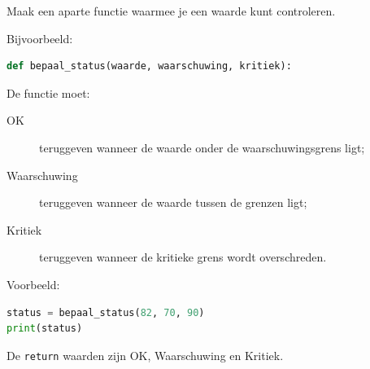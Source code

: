 Maak een aparte functie waarmee je een waarde kunt controleren.

Bijvoorbeeld:
\begin{lstlisting}[language=Python]
def bepaal_status(waarde, waarschuwing, kritiek):
\end{lstlisting}

De functie moet:
\begin{description}
\item[OK] teruggeven wanneer de waarde onder de waarschuwingsgrens ligt;
\item[Waarschuwing] teruggeven wanneer de waarde tussen de grenzen ligt;
\item[Kritiek] teruggeven wanneer de kritieke grens wordt overschreden.
\end{description}

Voorbeeld:
\begin{lstlisting}[language=Python]
status = bepaal_status(82, 70, 90)
print(status)
\end{lstlisting}

De \texttt{return} waarden zijn OK, Waarschuwing en Kritiek.

